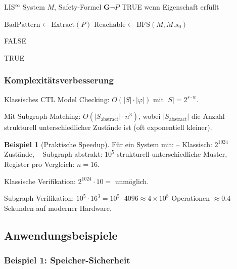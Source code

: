 \documentclass[a4paper,12pt]{article}
\theoremstyle{definition}
\newtheorem{beispiel}{Beispiel}
\begin{document}
\begin{algorithm}[H]
    \caption{Verifikation mit Subgraph Patterns}
    \label{alg:verify_subgraph}
    \begin{algorithmic}[1]
        \Require LIS$^{\infty}$ System $M$, Safety-Formel $\mathbf{G}\neg P$
        \Ensure TRUE wenn Eigenschaft erfüllt
        
        \State $\text{BadPattern} \gets \text{Extract}(P)$ 
        \State $\text{Reachable} \gets \text{BFS}(M, M.s_0)$ 
        
         
                \State \Return FALSE 
            \EndIf
        \EndFor
        
        \State \Return TRUE 
    \end{algorithmic}
\end{algorithm}

\subsubsection{Komplexitätsverbesserung}

Klassisches CTL Model Checking: $O(|S| \cdot |\varphi|)$ mit $|S| = 2^{s \cdot w}$.

Mit Subgraph Matching: $O(|S_{\text{abstract}}| \cdot n^3)$, wobei $|S_{\text{abstract}}|$ die Anzahl strukturell unterschiedlicher Zustände ist (oft exponentiell kleiner).

\begin{beispiel}[Praktische Speedup]
	Für ein System mit:
	-- Klassisch: $2^{1024}$ Zustände,
	-- Subgraph-abstrakt: $10^5$ strukturell unterschiedliche Muster,
	-- Register pro Vergleich: $n = 16$.
	
	Klassische Verifikation: $2^{1024} \cdot 10 = $ unmöglich.
	
	Subgraph Verifikation: $10^5 \cdot 16^3 = 10^5 \cdot 4096 \approx 4 \times 10^8$ Operationen $\approx 0.4$ Sekunden auf moderner Hardware.
\end{beispiel}

\subsection{Anwendungsbeispiele}

\subsubsection{Beispiel 1: Speicher-Sicherheit}
\end{document}
